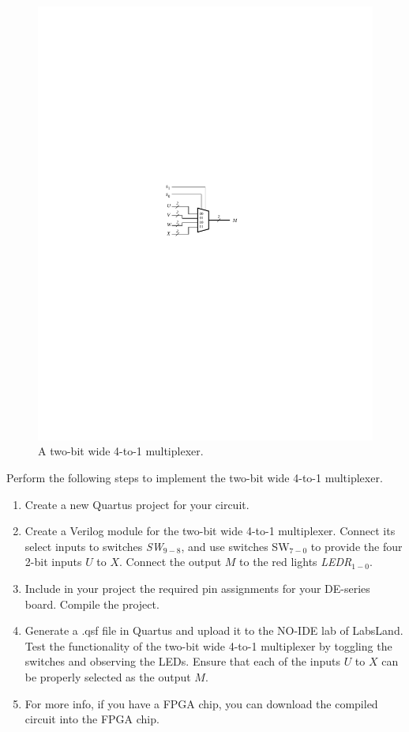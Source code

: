 \documentclass[epsfig,10pt,fullpage]{article}
\begin{document}
\begin{figure}[H]
	\begin{center}
		\includegraphics[]{figures/figure5.pdf}
	\end{center}
\caption{A two-bit wide 4-to-1 multiplexer.}
\label{fig:5}
\end{figure}

Perform the following steps to implement the two-bit wide 4-to-1 multiplexer.
\begin{enumerate}
\item Create a new Quartus project for your circuit.
\item Create a Verilog module for the two-bit wide 4-to-1 multiplexer. Connect its select
inputs to switches {\it SW}$_{9-8}$, and use switches SW$_{7-0}$ to
provide the four 2-bit inputs $U$ to $X$. Connect the 
output $M$ to the red lights {\it LEDR}$_{1-0}$.
\item Include in your project the required pin assignments for your DE-series board.
Compile the project.
\item Generate a .qsf file in Quartus and upload it to the NO-IDE lab of LabsLand. Test the functionality of the 
two-bit wide 4-to-1 multiplexer by toggling the switches and observing the LEDs. Ensure
that each of the inputs $U$ to $X$ can be properly selected as the output $M$.
\item For more info, if you have a FPGA chip, you can download the compiled circuit into the FPGA chip.
\end{enumerate}
\end{document}
